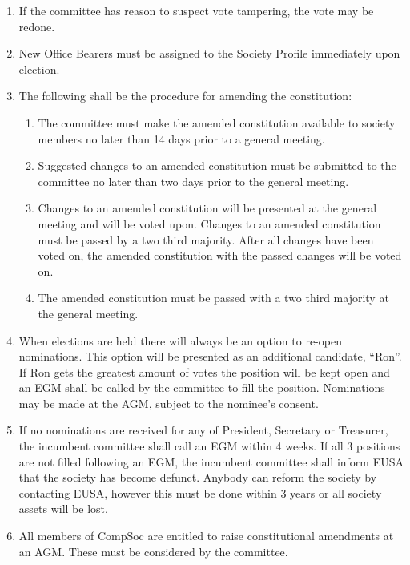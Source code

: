 \begin{enumerate}
\item If the committee has reason to suspect vote tampering, the vote may be redone.

\item New Office Bearers must be assigned to the Society Profile immediately upon election.

\item The following shall be the procedure for amending the constitution:
  \begin{enumerate}
  \item The committee must make the amended constitution available to society members no later than 14 days prior to a general meeting.
  \item Suggested changes to an amended constitution must be submitted to the committee no later than two days prior to the general meeting.
  \item Changes to an amended constitution will be presented at the general meeting and will be voted upon. Changes to an amended constitution must be passed by a two third majority. After all changes have been voted on, the amended constitution with the passed changes will be voted on.
  \item The amended constitution must be passed with a two third majority at the general meeting.
  \end{enumerate}

\item When elections are held there will always be an option to re-open nominations. This option will be presented as an additional candidate, \enquote{Ron}. If Ron gets the greatest amount of votes the position will be kept open and an EGM shall be called by the committee to fill the position. Nominations may be made at the AGM, subject to the nominee's consent.

\item If no nominations are received for any of President, Secretary or Treasurer, the incumbent committee shall call an EGM within 4 weeks. If all 3 positions are not filled following an EGM, the incumbent committee shall inform EUSA that the society has become defunct. Anybody can reform the society by contacting EUSA, however this must be done within 3 years or all society assets will be lost.

\item All members of CompSoc are entitled to raise constitutional amendments at an AGM. These must be considered by the committee.

\end{enumerate}
